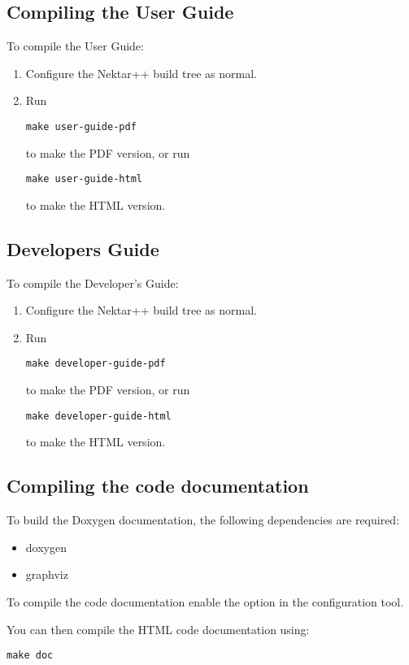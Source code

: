\subsection{Compiling the User Guide}
To compile the User Guide:
\begin{enumerate}
    \item Configure the Nektar++ build tree as normal.
    \item Run
    \begin{lstlisting}[style=BashInputStyle]
    make user-guide-pdf
    \end{lstlisting}
    to make the PDF version, or run
    \begin{lstlisting}[style=BashInputStyle]
    make user-guide-html
    \end{lstlisting}
    to make the HTML version.
\end{enumerate}


\subsection{Developers Guide}
To compile the Developer's Guide:
\begin{enumerate}
    \item Configure the Nektar++ build tree as normal.
    \item Run
    \begin{lstlisting}[style=BashInputStyle]
    make developer-guide-pdf
    \end{lstlisting}
    to make the PDF version, or run
    \begin{lstlisting}[style=BashInputStyle]
    make developer-guide-html
    \end{lstlisting}
    to make the HTML version.
\end{enumerate}

\subsection{Compiling the code documentation}
To build the Doxygen documentation, the following dependencies are required:
\begin{itemize}
    \item doxygen
    \item graphviz
\end{itemize}

To compile the code documentation enable the  option
in the  configuration tool.

You can then compile the HTML code documentation using:
\begin{lstlisting}[style=BashInputStyle]
make doc
\end{lstlisting}


